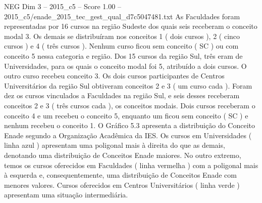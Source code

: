 \begin{textsample}{NEG Dim 3 – 2015\_c5 – Score 1.00 – 2015\_c5/enade\_2015\_tec\_gest\_qual\_d7c5047481.txt}
As Faculdades foram representadas por 16 cursos na região Sudeste dos quais seis receberam o conceito modal 3.
Os demais se distribuíram nos conceitos 1 ( dois cursos ), 2 ( cinco cursos ) e 4 ( três cursos ).
Nenhum curso ficou sem conceito ( SC ) ou com conceito 5 nessa categoria e região.
Dos 15 cursos da região Sul, três eram de Universidades, para os quais o conceito modal foi 5, atribuído a dois cursos.
O outro curso recebeu conceito 3.
Os dois cursos participantes de Centros Universitários da região Sul obtiveram conceitos 2 e 3 ( um curso cada ).
Foram dez os cursos vinculados a Faculdades na região Sul, e seis desses receberam conceitos 2 e 3 ( três cursos cada ), os conceitos modais.
Dois cursos receberam o conceito 4 e um recebeu o conceito 5, enquanto um ficou sem conceito ( SC ) e nenhum recebeu o conceito 1.
O Gráfico 5.3 apresenta a distribuição do Conceito Enade segundo a Organização Acadêmica da IES.
Os cursos em Universidades ( linha azul ) apresentam uma poligonal mais à direita do que as demais, denotando uma distribuição de Conceitos Enade maiores.
No outro extremo, temos os cursos oferecidos em Faculdades ( linha vermelha ) com a poligonal mais à esquerda e, consequentemente, uma distribuição de Conceitos Enade com menores valores.
Cursos oferecidos em Centros Universitários ( linha verde ) apresentam uma situação intermediária.

\end{textsample}
